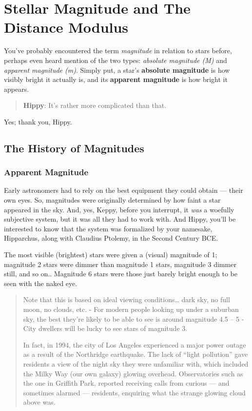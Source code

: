 \documentclass[
  letterpaper,
]{book}
\begin{document}
\chapter{Stellar Magnitude and The Distance
Modulus}\label{stellar-magnitude-and-the-distance-modulus}

You've probably encountered the term \emph{magnitude} in relation to
stars before, perhaps even heard mention of the two types:
\emph{absolute magnitude (M)} and \emph{apparent magnitude (m)}. Simply
put, a star's \textbf{absolute magnitude} is how visibly bright it
actually is, and its \textbf{apparent magnitude} is how bright it
appears.

\begin{quote}
\textbf{Hippy}: It's rather more complicated than that.
\end{quote}

Yes; thank you, Hippy.

\section{The History of Magnitudes}\label{the-history-of-magnitudes}

\subsection{Apparent Magnitude}\label{apparent-magnitude}

Early astronomers had to rely on the best equipment they could obtain
--- their own eyes. So, magnitudes were originally determined by how
faint a star appeared in the sky. And, yes, Keppy, before you interrupt,
it \emph{was} a woefully subjective system, but it was all they had to
work with. And Hippy, you'll be interested to know that the system was
formalized by your namesake, Hipparchus, along with Claudius Ptolemy, in
the Second Century BCE.

The most visible (brightest) stars were given a (visual) magnitude of 1;
magnitude 2 stars were dimmer than magnitude 1 stars, magnitude 3 dimmer
still, and so on.. Magnitude 6 stars were those just barely bright
enough to be seen with the naked eye.

\begin{quote}
Note that this is based on ideal viewing conditions\ldots{} dark sky, no
full moon, no clouds, etc. - For modern people looking up under a
suburban sky, the best they're likely to be able to see is around
magnitude 4.5 -- 5 - City dwellers will be lucky to see stars of
magnitude 3.

In fact, in 1994, the city of Los Angeles experienced a major power
outage as a result of the Northridge earthquake. The lack of ``light
pollution'' gave residents a view of the night sky they were unfamiliar
with, which included the Milky Way (our own galaxy) glowing overhead.
Observatories such as the one in Griffith Park, reported receiving calls
from curious --- and sometimes alarmed --- residents, enquiring what the
strange glowing cloud above was.
\end{quote}
\end{document}
